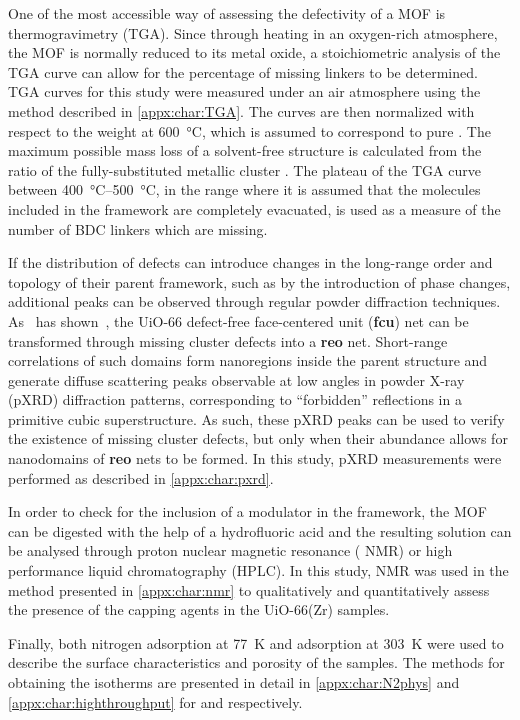 One of the most accessible way of assessing the defectivity of
a MOF is thermogravimetry (TGA). Since through heating in
an oxygen-rich atmosphere, the MOF is normally reduced to
its metal oxide, a stoichiometric analysis of the TGA curve
can allow for the percentage of missing linkers to be
determined. TGA curves for this study were measured under
an air atmosphere using the method described in \autoref{appx:char:TGA}.
The curves are then normalized with respect to the weight at
\SI{600}{\degreeCelsius}, which is assumed to correspond to pure
. The maximum possible mass loss of a solvent-free
structure is calculated from the ratio of the fully-substituted
metallic cluster . The plateau
of the TGA curve between \SIrange{400}{500}{\degreeCelsius},
in the range where it is assumed that the molecules included in
the framework are completely evacuated, is used as a measure of the
number of BDC linkers which are missing.


If the distribution of defects can introduce changes in the
long-range order and topology of their parent framework,
such as by the introduction of phase changes,
additional peaks can be observed through regular
powder diffraction techniques.
As~\citeauthor{cliffeCorrelatedDefectNanoregions2014} has
shown~\cite{cliffeCorrelatedDefectNanoregions2014},
the UiO-66 defect-free face-centered unit (\textbf{fcu})
net can be transformed through missing cluster defects into
a \textbf{reo} net. Short-range correlations of such domains
form nanoregions inside the parent structure and generate
diffuse scattering peaks observable at low angles in
powder X-ray (pXRD) diffraction patterns, corresponding to ``forbidden''
reflections in a primitive cubic superstructure.
As such, these pXRD peaks can be used to verify the existence of
missing cluster defects, but only when their abundance allows for
nanodomains of \textbf{reo} nets to be formed. In this study,
pXRD measurements were performed as described in \autoref{appx:char:pxrd}.

In order to check for the inclusion of a modulator in the framework,
the MOF can be digested with the help of a hydrofluoric acid and the
resulting solution can be analysed through proton nuclear magnetic 
resonance ( NMR) or high performance liquid chromatography
(HPLC). In this study,  NMR was used in the method presented
in \autoref{appx:char:nmr} to qualitatively and quantitatively assess
the presence of the capping agents in the UiO-66(Zr) samples. 

Finally, both nitrogen adsorption at \SI{77}{\kelvin} and  
adsorption at \SI{303}{\kelvin} were used to describe the surface 
characteristics and porosity of the samples. The methods for obtaining
the isotherms are presented in detail in \autoref{appx:char:N2phys}
and \autoref{appx:char:highthroughput} for  and 
respectively.
